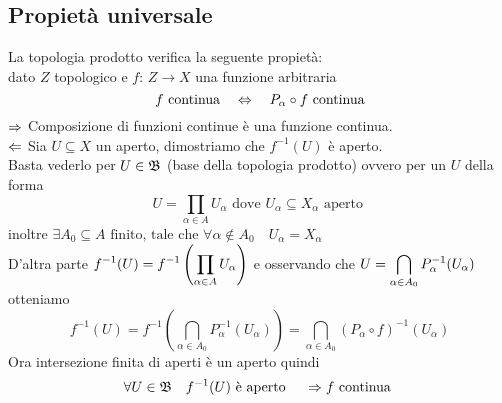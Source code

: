 \newpage
\subsection{Propiet\`a universale}
\begin{prop}\bianco
La topologia prodotto verifica la seguente propiet\`a:\\
dato $Z$ topologico e $f:\, Z \to X $ una funzione arbitraria
$$ f \text{ continua} \quad \Leftrightarrow \quad P_\alpha \circ f \text{ continua}$$
\proof$\Rightarrow$ Composizione di funzioni continue \`e una funzione continua.\\
$\Leftarrow$ Sia $U\subseteq X$ un aperto, dimostriamo che $f^{-1}(U)$ \`e aperto.\\
Basta vederlo per $U\in \mathfrak{B}$ (base della topologia prodotto) ovvero per un $U$ della forma
$$ U = \prod_{\alpha\in A} U_\alpha \text{ dove } U_\alpha\subseteq X_\alpha \text{ aperto } $$
inoltre $\exists A_0 \subseteq A \text{ finito, tale che } \forall \alpha \not \in A_0 \quad U_\alpha = X_\alpha$\\
D'altra parte $\displaystyle f^{-1}(U) =f^{-1} \left( \prod_{\alpha\in A} U_\alpha \right)$ e osservando che 
$U=\displaystyle\bigcap_{\alpha\in A_0} P_\alpha^{-1}(U_\alpha)$ otteniamo
$$ f^{-1}(U)= f^{-1} \left( \bigcap_{\alpha\in A_0} P^{-1}_\alpha(U_\alpha)\right) = \bigcap_{\alpha\in A_0 } (P_\alpha \circ f )^{-1}(U_\alpha)$$
Ora intersezione finita di aperti \`e un aperto quindi 
$$ \forall U \in \mathfrak{B} \quad f^{-1}(U) \text{ \`e aperto } \quad \Rightarrow f \text{ continua } $$
\endproof
\end{prop}
